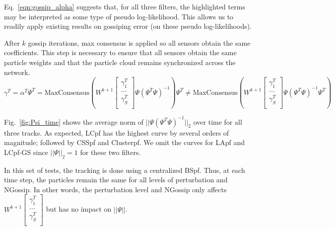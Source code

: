 \documentclass[10pt,letterpaper,final]{article}
\begin{document}
Eq.~\eqref{eqn:gossip_alpha} suggests that, for all three filters, the highlighted terms may be interpreted as some type of pseudo log-likelihood. This allows us to readily apply existing results on gossiping error (on these pseudo log-likelihoods). 

After $k$ gossip iterations, max consensus is applied so all sensors obtain the same coefficients. This step is necessary to ensure that all sensors obtain the same particle weights and that the particle cloud remains synchronized across the network. 
\begin{equation}
\gamma^T = \alpha^T\Psi^T = 
\text{MaxConsensus}\left(
W^{k+1}
\left[
\begin{array}{c}
\gamma_1^T \\
... \\
\gamma_S^T \\
\end{array}\right]\Psi(\Psi^T\Psi)^{-1}\right)\Psi^T
\neq \text{MaxConsensus}\left(
W^{k+1}
\left[
\begin{array}{c}
\gamma_1^T \\
... \\
\gamma_S^T \\
\end{array}\right]\Psi(\Psi^T\Psi)^{-1}\Psi^T\right)
\end{equation}

Fig.~\ref{fig:Psi_time} shows the average norm of $||\Psi(\Psi^T\Psi)^{-1}||_2$ over time for all three tracks. As expected, LCpf has the highest curve by several orders of magnitude; followed by CSSpf and Clusterpf. We omit the curves for LApf and LCpf-GS since $||\Psi||_2=1$ for these two filters. 

In this set of tests, the tracking is done using a centralized BSpf. Thus, at each time step, the particles remain the same for all levels of perturbation and NGossip. In other words, the perturbation level and NGossip only affects $W^{k+1}
\left[
\begin{array}{c}
\gamma_1^T \\
... \\
\gamma_S^T \\
\end{array}\right]$ but has no impact on $||\Psi||$.
\end{document}
